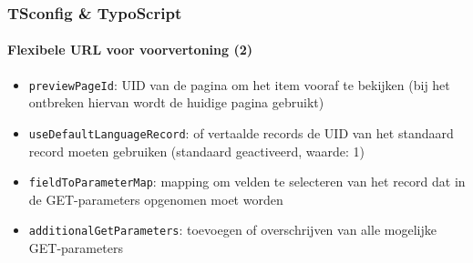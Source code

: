 \begin{frame}[fragile]
	\frametitle{TSconfig \& TypoScript}
	\framesubtitle{Flexibele URL voor voorvertoning (2)}

	\begin{itemize}
		\item \texttt{previewPageId}:\newline
			\smaller
				UID van de pagina om het item vooraf te bekijken
				(bij het ontbreken hiervan wordt de huidige pagina gebruikt)
			\normalsize
		\item \texttt{useDefaultLanguageRecord}:\newline
			\smaller
				of vertaalde records de UID van het standaard record moeten gebruiken\newline
				(standaard geactiveerd, waarde: 1)
			\normalsize
		\item \texttt{fieldToParameterMap}:\newline
			\smaller
				mapping om velden te selecteren van het record dat in de GET-parameters
				opgenomen moet worden
			\normalsize
		\item \texttt{additionalGetParameters}:\newline
			\smaller
				toevoegen of overschrijven van alle mogelijke GET-parameters
			\normalsize
	\end{itemize}

\end{frame}

